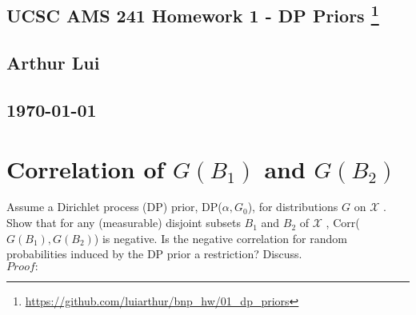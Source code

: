\documentclass{article}
\begin{document}
\begin{center}
  \section*{\textbf{UCSC AMS 241 Homework 1 - DP Priors}
    \footnote{\url{https://github.com/luiarthur/bnp_hw/01_dp_priors}}
  } 
  \subsection*{\textbf{Arthur Lui}}
  \subsection*{\noindent\today}
\end{center}

\noindent
\section{Correlation of $G(B_1)$ and $G(B_2)$}
Assume a Dirichlet process (DP) prior, DP($\alpha,G_0$), for distributions $G$
on $\mathcal X$ . Show that for any (measurable) disjoint subsets $B_1$ and
$B_2$ of $\mathcal X$ , Corr($G(B_1),G(B_2)$) is negative. Is the negative
correlation for random probabilities induced by the DP prior a restriction?
Discuss.\\

\noindent $Proof:$\\
\end{document}
